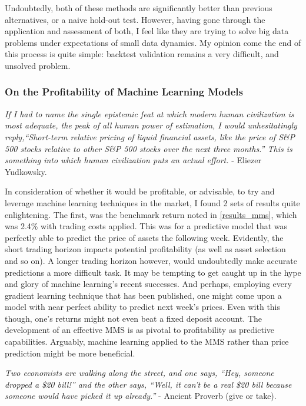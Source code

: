 \documentclass[a4paper,11pt,oneside]{article}
\theoremstyle{plain}
\theoremstyle{definition}
\begin{document}
	Undoubtedly, both of these methods are significantly better than previous alternatives, or a naive hold-out test. However, having gone through the application and assessment of both, I feel like they are trying to solve big data problems under expectations of small data dynamics. My opinion come the end of this process is quite simple: backtest validation remains a very difficult, and unsolved problem.
	
	\subsubsection{On the Profitability of Machine Learning Models}
	
	\textit{If I had to name the single epistemic feat at which modern human civilization is most adequate, the peak of all human power of estimation, I would unhesitatingly reply,``Short-term relative pricing of liquid financial assets, like the price of S\&P 500 stocks relative to other S\&P 500 stocks over the next three months.'' This is something into which human civilization puts an actual effort.} - Eliezer Yudkowsky. \newline

	In consideration of whether it would be profitable, or advisable, to try and leverage machine learning techniques in the market, I found 2 sets of results quite enlightening. The first, was the benchmark return noted in \ref{results_mms}, which was 2.4\% with trading costs applied. This was for a predictive model that was perfectly able to predict the price of assets the following week. Evidently, the short trading horizon impacts potential profitability (as well as asset selection and so on). A longer trading horizon however, would undoubtedly make accurate predictions a more difficult task. It may be tempting to get caught up in the hype and glory of machine learning's recent successes. And perhaps, employing every gradient learning technique that has been published, one might come upon a model with near perfect ability to predict next week's prices. Even with this though, one's returns might not even beat a fixed deposit account. The development of an effective MMS is as pivotal to profitability as predictive capabilities. Arguably, machine learning applied to the MMS rather than price prediction might be more beneficial.\newline
	
	\textit{Two economists are walking along the street, and one says, ``Hey, someone dropped a \$20 bill!'' and the other says, ``Well, it can't be a real \$20 bill because someone would have picked it up already.''} - Ancient Proverb (give or take). \newline
	
\end{document}
